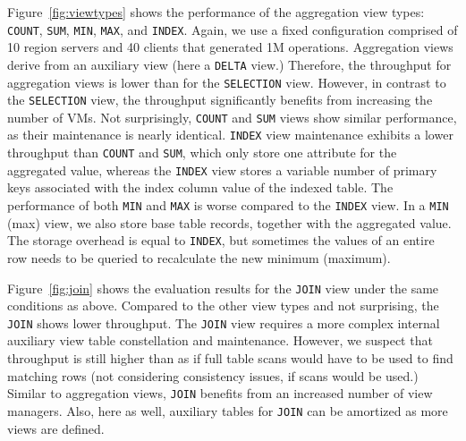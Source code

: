 Figure~\ref{fig:viewtypes} shows the performance of the aggregation
view types: \texttt{COUNT}, \texttt{SUM}, \texttt{MIN}, \texttt{MAX},
and \texttt{INDEX}. Again, we use a fixed configuration comprised of
10 region servers and 40 clients that generated 1M operations.
Aggregation views derive from an auxiliary view (here a \texttt{DELTA}
view.)  Therefore, the throughput for aggregation views is lower than
for the \texttt{SELECTION} view. However, in contrast to the
\texttt{SELECTION} view, the throughput significantly benefits from
increasing the number of VMs. Not surprisingly, \texttt{COUNT} and
\texttt{SUM} views show similar performance, as their maintenance is
nearly identical.  \texttt{INDEX} view maintenance exhibits a lower
throughput than \texttt{COUNT} and \texttt{SUM}, which only store one
attribute for the aggregated value, whereas the \texttt{INDEX} view
stores a variable number of primary keys associated with the index
column value of the indexed table.  The performance of both
\texttt{MIN} and \texttt{MAX} is worse compared to the \texttt{INDEX}
view. In a \texttt{MIN} (max) view, we also store base table records,
together with the aggregated value.  The storage overhead is equal to
\texttt{INDEX}, but sometimes the values of an entire row needs to be
queried to recalculate the new minimum (maximum).  


Figure~\ref{fig:join} shows the evaluation results for the
\texttt{JOIN} view under the same conditions as above. Compared to the
other view types and not surprising, the \texttt{JOIN} shows lower
throughput.  The \texttt{JOIN} view requires a more complex internal
auxiliary view table constellation and maintenance. However, we suspect
that throughput is still higher than as if full table scans would have
to be used to find matching rows (not considering consistency issues,
if scans would be used.)  Similar to aggregation views, \texttt{JOIN}
benefits from an increased number of view managers. Also, here as
well, auxiliary tables for \texttt{JOIN} can be amortized as more
views are defined.

